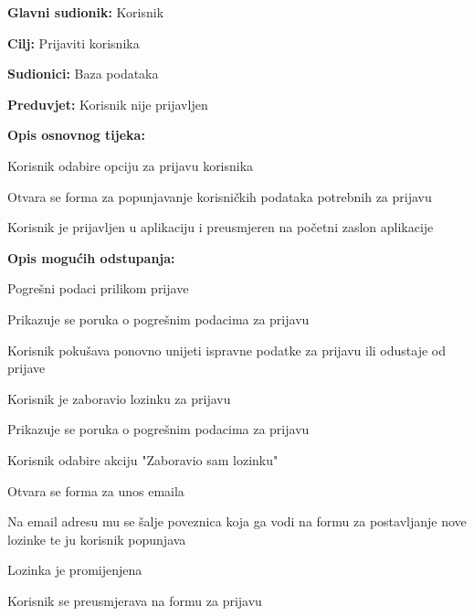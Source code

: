 \noindent {}
\begin{packed_item}

	\item \textbf{Glavni sudionik:} Korisnik
	\item  \textbf{Cilj:} Prijaviti korisnika
	\item  \textbf{Sudionici:} Baza podataka
	\item  \textbf{Preduvjet:} Korisnik nije prijavljen
	\item  \textbf{Opis osnovnog tijeka:}
	
	\item[] \begin{packed_enum}
		
		\item Korisnik odabire opciju za prijavu korisnika
		\item Otvara se forma za popunjavanje korisničkih podataka potrebnih za prijavu
		\item Korisnik je prijavljen u aplikaciju i preusmjeren na početni zaslon aplikacije

	\end{packed_enum}

	\item  \textbf{Opis mogućih odstupanja:}
	
	\item[] \begin{packed_item}
	
		\item[2.a] Pogrešni podaci prilikom prijave
		\item[] \begin{packed_enum}
			
			\item Prikazuje se poruka o pogrešnim podacima za prijavu 
			\item Korisnik pokušava ponovno unijeti ispravne podatke za prijavu ili odustaje od prijave
			
		\end{packed_enum}
		
		\item[2.b] Korisnik je zaboravio lozinku za prijavu
		\item[] \begin{packed_enum}
			
			\item Prikazuje se poruka o pogrešnim podacima za prijavu 
			\item Korisnik odabire akciju "Zaboravio sam lozinku"
			\item Otvara se forma za unos emaila
			\item Na email adresu mu se šalje poveznica koja ga vodi na formu za postavljanje nove lozinke te ju korisnik popunjava
			\item Lozinka je promijenjena
			\item Korisnik se preusmjerava na formu za prijavu
			
		\end{packed_enum}

	\end{packed_item}
\end{packed_item}

